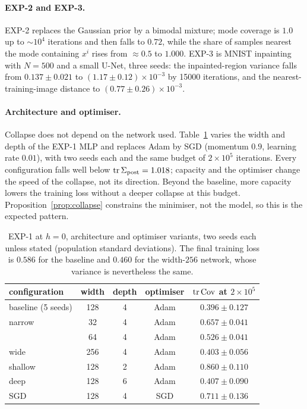 \documentclass{article} %
\theoremstyle{plain}
\theoremstyle{definition}
\theoremstyle{remark}
\begin{document}
\paragraph{EXP-2 and EXP-3.} EXP-2 replaces the Gaussian prior by a bimodal mixture; mode
coverage is $1.0$ up to $\sim\!10^4$ iterations and then falls to $0.72$, while the share of samples
nearest the mode containing $x^i$ rises from $\approx0.5$ to $1.000$. EXP-3 is MNIST inpainting with
$N=500$ and a small U-Net, three seeds: the inpainted-region variance falls from
$0.137\pm0.021$ to $(1.17\pm0.12)\times10^{-3}$ by 15000 iterations, and the nearest-training-image
distance to $(0.77\pm0.26)\times10^{-3}$.

\paragraph{Architecture and optimiser.} Collapse does not depend on the network used.
Table~\ref{tab:ablation} varies the width and depth of the EXP-1 MLP and replaces Adam by SGD
(momentum $0.9$, learning rate $0.01$), with two seeds each and the same budget of $2\times10^5$
iterations. Every configuration falls well below $\operatorname{tr}\Sigma_{\mathrm{post}}=1.018$; capacity and the
optimiser change the speed of the collapse, not its direction. Beyond the baseline, more capacity
lowers the training loss without a deeper collapse at this budget. Proposition~\ref{prop:collapse}
constrains the minimiser, not the model, so this is the expected pattern.

\begin{table}[htb]
\centering\small
\begin{tabular}{lcccc}
\toprule
configuration & width & depth & optimiser & $\operatorname{tr}\operatorname{Cov}$ at $2\times10^5$ \\
\midrule
baseline (5 seeds) & 128 & 4 & Adam & $0.396\pm0.127$\\
narrow & 32 & 4 & Adam & $0.657\pm0.041$\\
 & 64 & 4 & Adam & $0.526\pm0.041$\\
wide & 256 & 4 & Adam & $0.403\pm0.056$\\
shallow & 128 & 2 & Adam & $0.860\pm0.110$\\
deep & 128 & 6 & Adam & $0.407\pm0.090$\\
SGD & 128 & 4 & SGD & $0.711\pm0.136$\\
\bottomrule
\end{tabular}
\caption{EXP-1 at $h=0$, architecture and optimiser variants, two seeds each unless stated
(population standard deviations). The final training loss is $0.586$ for the baseline and $0.460$
for the width-$256$ network, whose variance is nevertheless the same.}
\label{tab:ablation}
\end{table}
\end{document}
